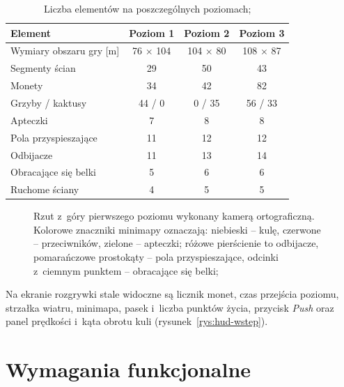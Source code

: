 \begin{table}[!htb]
  \centering
  \caption{Liczba elementów na poszczególnych poziomach; \zrodloWlasne}
  \label{tab:poziomy}
  \begin{tabular}{l c c c}
    \toprule
    \textbf{Element} & \textbf{Poziom 1} & \textbf{Poziom 2} & \textbf{Poziom 3} \\
    \midrule
    Wymiary obszaru gry [m] & 76 $\times$ 104 & 104 $\times$ 80 & 108 $\times$ 87 \\
    Segmenty ścian & 29 & 50 & 43 \\
    Monety & 34 & 42 & 82 \\
    Grzyby / kaktusy & 44 / 0 & 0 / 35 & 56 / 33 \\
    Apteczki & 7 & 8 & 8 \\
    Pola przyspieszające & 11 & 12 & 12 \\
    Odbijacze & 11 & 13 & 14 \\
    Obracające się belki & 5 & 6 & 6 \\
    Ruchome ściany & 4 & 5 & 5 \\
    \bottomrule
  \end{tabular}
\end{table}

\begin{figure}[!htb]
  \centering
  \caption{Rzut z~góry pierwszego poziomu wykonany kamerą ortograficzną. Kolorowe znaczniki
    minimapy oznaczają: niebieski -- kulę, czerwone -- przeciwników, zielone -- apteczki;
    różowe pierścienie to odbijacze, pomarańczowe prostokąty -- pola przyspieszające,
    odcinki z~ciemnym punktem -- obracające się belki; \zrodloWlasne}
  \label{rys:poziom1-gora}
\end{figure}

Na ekranie rozgrywki stale widoczne są licznik monet, czas przejścia poziomu, strzałka
wiatru, minimapa, pasek i~liczba punktów życia, przycisk \emph{Push} oraz panel prędkości
i~kąta obrotu kuli (rysunek~\ref{rys:hud-wstep}).

\section{Wymagania funkcjonalne}

